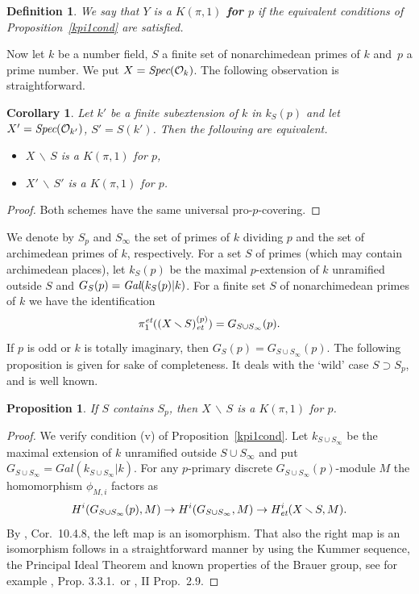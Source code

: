 \documentclass[10pt]{article}
\newcommand{\Spec}{\text{\it Spec}}
\renewcommand{\O}{{\mathcal{O}}}
\newcommand{\sm}{{\,\smallsetminus\,}}
\newcommand{\et}{\text{\it et}}
\newcommand{\Gal}{\text{\it Gal}}
\theoremstyle{alex}
\newtheorem{corollary}[theorem]{Corollary}
\newtheorem{proposition}[theorem]{Proposition}
\theoremstyle{alexdef}
\newtheorem*{definition}{Definition}
\begin{document}
\begin{definition}
We say that $Y$ is a {\bf\boldmath $K(\pi,1)$ for\/ $p$} if the equivalent conditions of Proposition~\ref{kpi1cond} are satisfied.
\end{definition}

Now let $k$ be a number field, $S$ a finite set of nonarchimedean primes of $k$ and~$p$\/ a prime number. We put $X=\Spec(\O_k)$.  The following observation is straightforward.

\begin{corollary}\label{finite_ext}
Let $k'$ be a finite subextension of\/ $k$ in $k_S(p)$ and let $X'=\Spec(\O_{k'})$, $S'=S(k')$. Then the following are equivalent.
\begin{itemize}
\item[\rm (i)] $X\sm S$ is a $K(\pi,1)$ for $p$,
\item[\rm (ii)] $X'\sm S'$ is a $K(\pi,1)$ for $p$.
\end{itemize}
\end{corollary}

\begin{proof}
Both schemes have the same universal pro-$p$-covering.
\end{proof}

\bigskip
We denote by $S_p$ and $S_\infty$ the set of primes of $k$ dividing $p$ and the set of archimedean primes of $k$, respectively. For a set $S$ of primes (which may contain archimedean places), let $k_S(p)$ be the maximal $p$-extension of $k$ unramified outside $S$ and $G_S(p)=\Gal(k_S(p)|k)$. For a finite set $S$ of nonarchimedean primes of $k$ we have the identification
\[
\pi_1^\et((X\sm S)_\et^{(p)})= G_{S\cup S_\infty}(p).
\]
If $p$ is odd or $k$ is totally imaginary, then $G_S(p)=G_{S\cup S_\infty}(p)$.
The following proposition is given for sake of completeness. It deals with the `wild' case $S\supset S_p$, and is well known.
\begin{proposition} \label{wildiskpi1}
If\/ $S$ contains $S_p$, then $X\sm S$ is a $K(\pi,1)$ for $p$.
\end{proposition}
\begin{proof}  We verify condition (v) of Proposition~\ref{kpi1cond}. Let $k_{S\cup S_\infty}$ be the maximal extension of $k$ unramified outside $S\cup S_\infty$ and put $G_{S\cup S_\infty}=Gal(k_{S\cup S_\infty}|k)$. For any $p$-primary discrete $G_{S\cup S_\infty}(p)$-module $M$ the homomorphism $\phi_{M,i}$ factors as
\[
H^i(G_{S\cup S_\infty}(p),M) \to H^i(G_{S\cup S_\infty},M) \to H^i_\et(X\sm S, M).
\]
By \cite{NSW}, Cor.~10.4.8, the left map is an isomorphism. That also the right map is an isomorphism follows in a straightforward manner by using the Kummer sequence, the Principal Ideal Theorem and known properties of the Brauer group, see for example \cite{Zi}, Prop. 3.3.1.\ or \cite{Mi}, II Prop.~2.9.
\end{proof}
\end{document}
